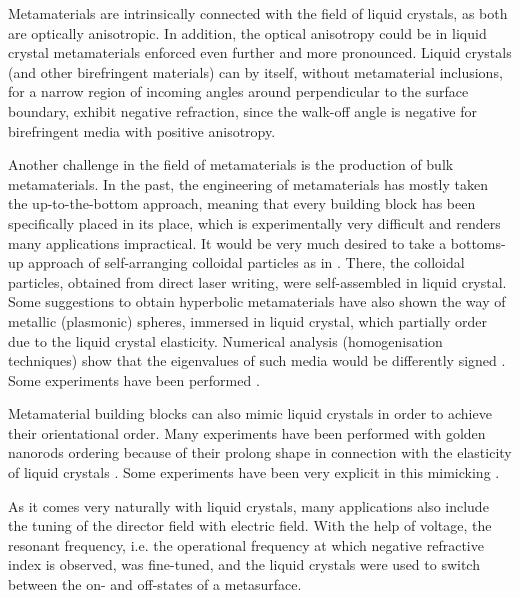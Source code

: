 \documentclass[a4paper,11pt]{article}
\begin{document}

Metamaterials are intrinsically connected with the field of liquid crystals, as both are optically anisotropic. 
In addition, the optical anisotropy could be in liquid crystal metamaterials enforced even further and more pronounced. 
Liquid crystals (and other birefringent materials) can by itself, without metamaterial inclusions, for a narrow region of incoming angles around perpendicular to the surface boundary, exhibit negative refraction, since the walk-off angle is negative for birefringent media with positive anisotropy. 


Another challenge in the field of metamaterials is the production of bulk metamaterials. 
In the past, the engineering of metamaterials has mostly taken the up-to-the-bottom approach, meaning that every building block has been specifically placed in its place, which is experimentally very difficult and renders many applications impractical. 
It would be very much desired to take a bottoms-up approach of self-arranging colloidal particles as in \cite{tartan}. 
There, the colloidal particles, obtained from direct laser writing, were self-assembled in liquid crystal. 
Some suggestions to obtain hyperbolic metamaterials have also shown the way of metallic (plasmonic) spheres, immersed in liquid crystal, which partially order due to the liquid crystal elasticity. 
Numerical analysis (homogenisation techniques) show that the eigenvalues of such media would be differently signed \cite{khoo}. 
Some experiments have been performed \cite{ponsinet-virginie?}. 

Metamaterial building blocks can also mimic liquid crystals in order to achieve their orientational order. 
Many experiments have been performed with golden nanorods ordering because of their prolong shape in connection with the elasticity of liquid crystals \cite{nanoparticles}. 
Some experiments have been very explicit in this mimicking \cite{shadrivov}. 

As it comes very naturally with liquid crystals, many applications also include the tuning of the director field with electric field. 
With the help of voltage, the resonant frequency, i.e. the operational frequency at which negative refractive index is observed, was fine-tuned, and the liquid crystals were used to switch between the on- and off-states of a metasurface. 
\end{document}
